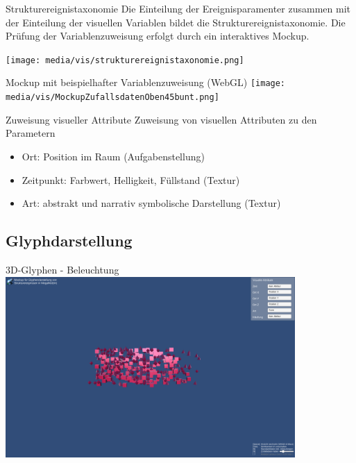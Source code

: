 \documentclass[10pt]{beamer}
\begin{document}
\begin{frame}{Strukturereignistaxonomie}
	Die Einteilung der Ereignisparamenter zusammen mit der Einteilung der visuellen Variablen bildet die Strukturereignistaxonomie. Die Prüfung der Variablenzuweisung erfolgt durch ein interaktives Mockup.

	\texttt{[image: media/vis/strukturereignistaxonomie.png]}
\end{frame}

\begin{frame}{Mockup mit beispielhafter Variablenzuweisung (WebGL)}
	\texttt{[image: media/vis/MockupZufallsdatenOben45bunt.png]}
\end{frame}

\begin{frame}{Zuweisung visueller Attribute}
	Zuweisung von visuellen Attributen zu den Parametern
	\begin{itemize}
		\item Ort: Position im Raum (Aufgabenstellung)
		\item Zeitpunkt: Farbwert, Helligkeit, Füllstand (Textur)
		\item Art: abstrakt und narrativ symbolische Darstellung (Textur)
	\end{itemize}
\end{frame}

\subsection{Glyphdarstellung} %

\begin{frame}{3D-Glyphen - Beleuchtung}
	\includegraphics*[height=6.9cm]{media/vis/Mockup-Zufallsdaten-persp-ArtForm-vornEntfernter.png}
\end{frame}
\end{document}
